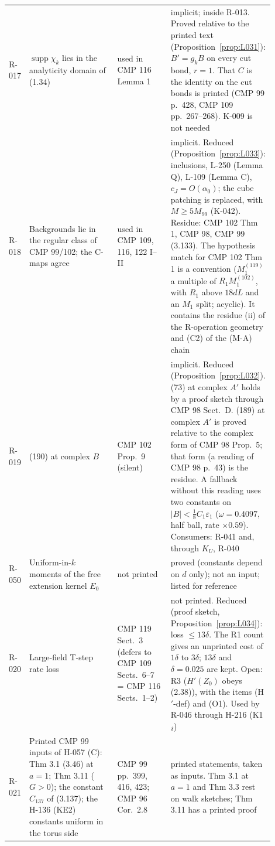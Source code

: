 {\begin{longtable}{p{0.05\linewidth}p{0.33\linewidth}p{0.2\linewidth}p{0.32\linewidth}}
R-017 & $\operatorname{supp}\chi_k$ lies in the analyticity domain of (1.34) & used in CMP 116 Lemma 1 & implicit; inside R-013. Proved relative to the printed text (Proposition~\ref{prop:L031}): $B'=g_kB$ on every cut bond, $r=1$. That $C$ is the identity on the cut bonds is printed (CMP 99 p.~428, CMP 109 pp.~267--268). K-009 is not needed \\
R-018 & Backgrounds lie in the regular class of CMP 99/102; the C-maps agree & used in CMP 109, 116, 122 I--II & implicit. Reduced (Proposition~\ref{prop:L033}): inclusions, L-250 (Lemma Q), L-109 (Lemma C), $c_J=O(\alpha_0)$; the cube patching is replaced, with $M\ge5M_{99}$ (K-042). Residue: CMP 102 Thm 1, CMP 98, CMP 99 (3.133). The hypothesis match for CMP 102 Thm 1 is a convention ($M_1^{(119)}$ a multiple of $R_1M_1^{(102)}$, with $R_1$ above $18dL$ and an $M_1$ split; acyclic). It contains the residue (ii) of the R-operation geometry and (C2) of the (M-A) chain \\
R-019 & (190) at complex $B$ & CMP 102 Prop.\ 9 (silent) & implicit. Reduced (Proposition~\ref{prop:L032}). (73) at complex $A'$ holds by a proof sketch through CMP 98 Sect.~D. (189) at complex $A'$ is proved relative to the complex form of CMP 98 Prop.~5; that form (a reading of CMP 98 p.~43) is the residue. A fallback without this reading uses two constants on $|B|<\tfrac18C_1\varepsilon_1$ ($\omega=0.4097$, half ball, rate $\times0.59$). Consumers: R-041 and, through $K_U$, R-040 \\
R-050 & Uniform-in-$k$ moments of the free extension kernel $E_0$ & not printed & proved (constants depend on $d$ only); not an input; listed for reference \\
R-020 & Large-field T-step rate loss & CMP 119 Sect.\ 3 (defers to CMP 109 Sects.\ 6--7 = CMP 116 Sects.\ 1--2) & not printed. Reduced (proof sketch, Proposition~\ref{prop:L034}): loss $\le13\delta$. The R1 count gives an unprinted cost of $1\delta$ to $3\delta$; $13\delta$ and $\delta=0.025$ are kept. Open: R3 ($H'(Z_0)$ obeys (2.38)), with the items (H$'$-def) and (O1). Used by R-046 through H-216 (K1$_\delta$) \\
R-021 & Printed CMP 99 inputs of H-057 (C): Thm 3.1 (3.46) at $a=1$; Thm 3.11 ($G>0$); the constant $C_{137}$ of (3.137); the H-136 (KE2) constants uniform in the torus side & CMP 99 pp.\ 399, 416, 423; CMP 96 Cor.\ 2.8 & printed statements, taken as inputs. Thm 3.1 at $a=1$ and Thm 3.3 rest on walk sketches; Thm 3.11 has a printed proof \\

\end{longtable}}
